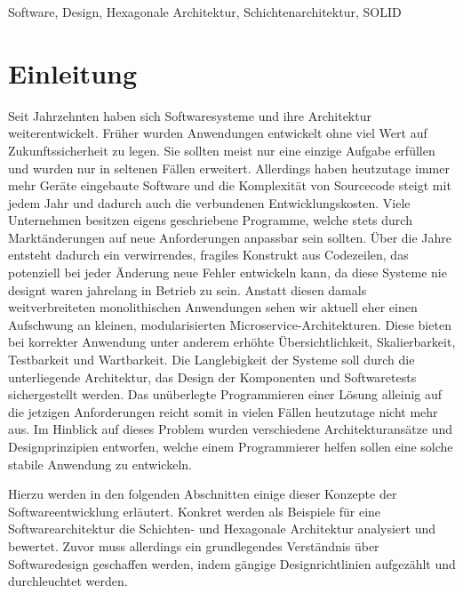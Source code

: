 \documentclass[conference]{IEEEtran}
\begin{document}
\begin{IEEEkeywords}
Software, Design, Hexagonale Architektur, Schichtenarchitektur, SOLID
\end{IEEEkeywords}



\section{Einleitung}



Seit Jahrzehnten haben sich Softwaresysteme und ihre Architektur weiterentwickelt. Früher wurden Anwendungen entwickelt ohne viel Wert auf Zukunftssicherheit zu legen. Sie sollten meist nur eine einzige Aufgabe erfüllen und wurden nur in seltenen Fällen erweitert. Allerdings haben heutzutage immer mehr Geräte eingebaute Software und die Komplexität von Sourcecode steigt mit jedem Jahr und dadurch auch die verbundenen Entwicklungskosten. Viele Unternehmen besitzen eigens geschriebene Programme, welche stets durch Marktänderungen auf neue Anforderungen anpassbar sein sollten. Über die Jahre entsteht dadurch ein verwirrendes, fragiles Konstrukt aus Codezeilen, das potenziell bei jeder Änderung neue Fehler entwickeln kann, da diese Systeme nie designt waren jahrelang in Betrieb zu sein. Anstatt diesen damals weitverbreiteten monolithischen Anwendungen sehen wir aktuell eher einen Aufschwung an kleinen, modularisierten Microservice-Architekturen. Diese bieten bei korrekter Anwendung unter anderem erhöhte Übersichtlichkeit, Skalierbarkeit, Testbarkeit und Wartbarkeit. \cite{Chen.2018} \cite{Dragoni.2017} Die Langlebigkeit der Systeme soll durch die unterliegende Architektur, das Design der Komponenten und Softwaretests sichergestellt werden. Das unüberlegte Programmieren einer Lösung alleinig auf die jetzigen Anforderungen reicht somit in vielen Fällen heutzutage nicht mehr aus. Im Hinblick auf dieses Problem wurden verschiedene Architekturansätze und Designprinzipien entworfen, welche einem Programmierer helfen sollen eine solche stabile Anwendung zu entwickeln.

Hierzu werden in den folgenden Abschnitten einige dieser Konzepte der Softwareentwicklung erläutert. Konkret werden als Beispiele für eine Softwarearchitektur die Schichten- und Hexagonale Architektur analysiert und bewertet. Zuvor muss allerdings ein grundlegendes Verständnis über Softwaredesign geschaffen werden, indem gängige Designrichtlinien aufgezählt und durchleuchtet werden.
\end{document}
